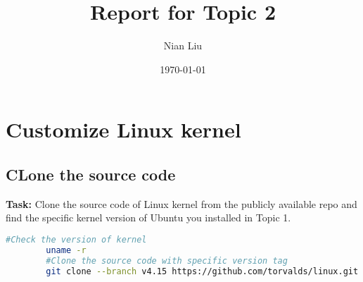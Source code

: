 \documentclass[twocolumn]{article}
\title{Report for Topic 2}
\author{Nian Liu}
\date{\today}
\begin{document}
 
	\maketitle
	\section{Customize Linux kernel}
	\subsection{CLone the source code}
	\textbf{Task:} Clone the source code of Linux kernel from the publicly available repo and find the specific kernel version of Ubuntu you installed in Topic 1.
	\begin{lstlisting}[language=bash]
		#Check the version of kernel
		uname -r
		#Clone the source code with specific version tag
		git clone --branch v4.15 https://github.com/torvalds/linux.git
	\end{lstlisting}
\end{document}
